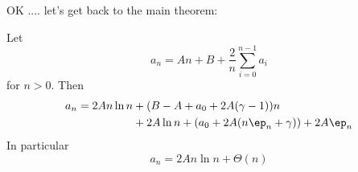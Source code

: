 OK .... let's get back to the main theorem:

\begin{thm}
  Let
  \[
  a_n = An + B + \frac{2}{n} \sum_{i=0}^{n-1} a_i
  \]
  for $n > 0$.
  Then 
  \begin{align*}
  a_n = 2A n \ln n &+ (B - A + a_0 + 2A(\gamma - 1)) n \\
    &+ 2A\ln n 
 + \left(a_0 + 2A(n \ep_n + \gamma)\right) 
 + 2A\ep_n
 \end{align*}
 In particular
   \[
  a_n = 2A n \ln n + \Theta(n)
  \]

\end{thm}

\proof













